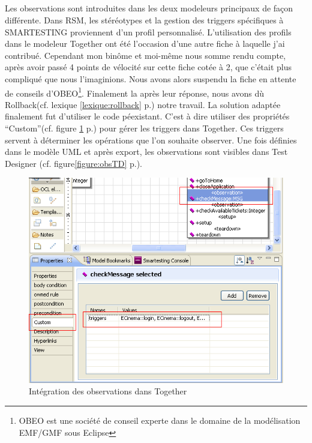 \subparagraph*{}
Les observations sont introduites dans les deux modeleurs principaux de façon différente. Dans RSM, les stéréotypes et la gestion des triggers spécifiques à SMARTESTING proviennent d'un profil personnalisé. L'utilisation des profils dans le modeleur Together ont été l'occasion d'une autre fiche à laquelle j'ai contribué. Cependant mon binôme et moi-même nous somme rendu compte, après avoir passé 4 points de vélocité sur cette fiche cotée à 2, que c'était plus compliqué que nous l'imaginions. Nous avons alors suspendu la fiche en attente de conseils d'OBEO\footnote{OBEO est une société de conseil experte dans le domaine de la modélisation EMF/GMF sous Eclipse}. Finalement la après leur réponse, nous avons dù Rollback(cf. lexique \ref{lexique:rollback} p.\pageref{lexique:rollback}) notre travail. La solution adaptée finalement fut d'utiliser le code péexistant. C'est à dire utiliser des propriétés ``Custom''(cf. figure \ref{figure:obsTriggerTG} p.\pageref{figure:obsTriggerTG}) pour gérer les triggers dans Together. Ces triggers servent à déterminer les opérations que l'on souhaite observer. Une fois définies dans le modèle UML et après export, les observations sont visibles dans Test Designer (cf. figure\ref{figure:obsTD} p.\pageref{figure:obsTD}).

\begin{figure}[!h]
\centering
\includegraphics[scale=0.5]{Illustrations/Observation_Trigger_Together.png}
\caption{Intégration des observations dans Together}
\label{figure:obsTriggerTG}
\end{figure}

